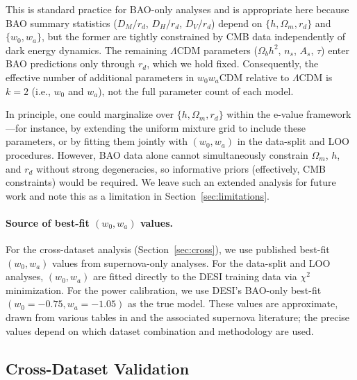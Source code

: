 \documentclass[11pt,a4paper]{article}
\newcommand{\LCDM}{$\Lambda$CDM}
\begin{document}
This is standard practice for BAO-only analyses and is appropriate here because BAO summary statistics ($D_M/r_d$, $D_H/r_d$, $D_V/r_d$) depend on $\{h, \Omega_m, r_d\}$ and $\{w_0, w_a\}$, but the former are tightly constrained by CMB data independently of dark energy dynamics. The remaining \LCDM{} parameters ($\Omega_b h^2$, $n_s$, $A_s$, $\tau$) enter BAO predictions only through $r_d$, which we hold fixed. Consequently, the effective number of additional parameters in $w_0w_a$CDM relative to \LCDM{} is $k = 2$ (i.e., $w_0$ and $w_a$), not the full parameter count of each model.

In principle, one could marginalize over $\{h, \Omega_m, r_d\}$ within the e-value framework---for instance, by extending the uniform mixture grid to include these parameters, or by fitting them jointly with $(w_0, w_a)$ in the data-split and LOO procedures. However, BAO data alone cannot simultaneously constrain $\Omega_m$, $h$, and $r_d$ without strong degeneracies, so informative priors (effectively, CMB constraints) would be required. We leave such an extended analysis for future work and note this as a limitation in Section~\ref{sec:limitations}.

\paragraph{Source of best-fit $(w_0, w_a)$ values.} For the cross-dataset analysis (Section~\ref{sec:cross}), we use published best-fit $(w_0, w_a)$ values from supernova-only analyses. For the data-split and LOO analyses, $(w_0, w_a)$ are fitted directly to the DESI training data via $\chi^2$ minimization. For the power calibration, we use DESI's BAO-only best-fit $(w_0 = -0.75, w_a = -1.05)$ as the true model. These values are approximate, drawn from various tables in \citet{DESI2025} and the associated supernova literature; the precise values depend on which dataset combination and methodology are used.

\subsection{Cross-Dataset Validation}
\end{document}
